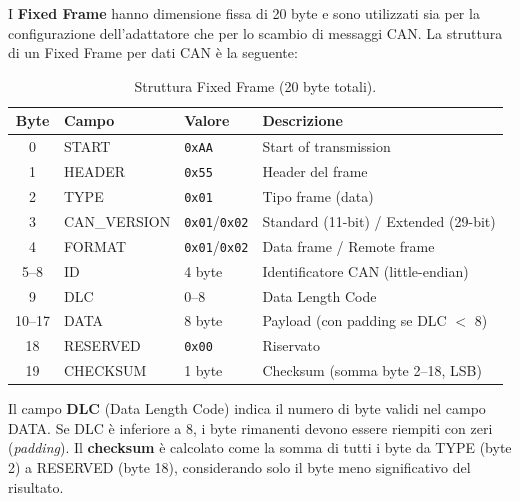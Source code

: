 I \textbf{Fixed Frame} hanno dimensione fissa di 20 byte e sono utilizzati sia per la configurazione dell'adattatore che per lo scambio di messaggi CAN. La struttura di un Fixed Frame per dati CAN è la seguente:

\begin{table}[htbp]
    \centering
    \caption{Struttura Fixed Frame (20 byte totali).}
    \label{tab:fixed_frame}
    \begin{tabular}{clll}
        \toprule
        \textbf{Byte} & \textbf{Campo} & \textbf{Valore}             & \textbf{Descrizione}                  \\
        \midrule
        0             & START          & \texttt{0xAA}               & Start of transmission                 \\
        1             & HEADER         & \texttt{0x55}               & Header del frame                      \\
        2             & TYPE           & \texttt{0x01}               & Tipo frame (data)                     \\
        3             & CAN\_VERSION   & \texttt{0x01}/\texttt{0x02} & Standard (11-bit) / Extended (29-bit) \\
        4             & FORMAT         & \texttt{0x01}/\texttt{0x02} & Data frame / Remote frame             \\
        5--8          & ID             & 4 byte                      & Identificatore CAN (little-endian)    \\
        9             & DLC            & 0--8                        & Data Length Code                      \\
        10--17        & DATA           & 8 byte                      & Payload (con padding se DLC $<$ 8)    \\
        18            & RESERVED       & \texttt{0x00}               & Riservato                             \\
        19            & CHECKSUM       & 1 byte                      & Checksum (somma byte 2--18, LSB)      \\
        \bottomrule
    \end{tabular}
\end{table}

Il campo \textbf{DLC} (Data Length Code) indica il numero di byte validi nel campo DATA. Se DLC è inferiore a 8, i byte rimanenti devono essere riempiti con zeri (\textit{padding}). Il \textbf{checksum} è calcolato come la somma di tutti i byte da TYPE (byte 2) a RESERVED (byte 18), considerando solo il byte meno significativo del risultato.

